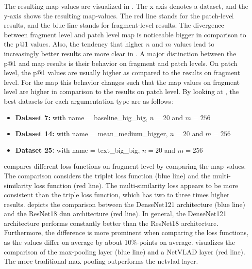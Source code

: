 \noindent The resulting \ac{map} values are visualized in . The x-axis denotes a dataset, and the y-axis shows the resulting \ac{map}-values. The red line stands for the patch-level results, and the blue line stands for fragment-level results. The divergence between fragment level and patch level \ac{map} is noticeable bigger in comparison to the \ac{p@1} values. Also, the tendency that higher \(n\) and \(m\) values lead to increasingly better results are more clear in . A major distinction between the \ac{p@1} and \ac{map} results is their behavior on fragment and patch levels. On patch level, the \ac{p@1} values are usually higher as compared to the results on fragment level. For the \ac{map} this behavior changes such that the \ac{map} values on fragment level are higher in comparison to the results on patch level. By looking at , the best datasets for each argumentation type are as follows:
%
\begin{itemize}
	\item \textbf{Dataset 7:} with name = baseline\_big\_big, \(n=20\) and \(m=256\)
	\item \textbf{Dataset 14:} with name = mean\_medium\_bigger, \(n=20\) and \(m=256\)
	\item \textbf{Dataset 25:} with name = text\_big\_big, \(n=20\) and \(m=256\)
\end{itemize}
%
\noindent {} compares different loss functions on fragment level by comparing the \ac{map} values. The comparison considers the triplet loss function (blue line) and the multi-similarity loss function (red line). The multi-similarity loss appears to be more consistent than the triple loss function, which has two to three times higher results.  depicts the comparison between the DenseNet121 architecture (blue line) and the ResNet18 \ac{dnn} architecture (red line). In general, the DenseNet121 architecture performs constantly better than the ResNet18 architecture. Furthermore, the difference is more prominent when comparing the loss functions, as the values differ on average by about 10\%-points on average.  visualizes the comparison of the max-pooling layer (blue line) and a NetVLAD layer (red line). The more traditional max-pooling outperforms the \ac{netvlad} layer.\\

